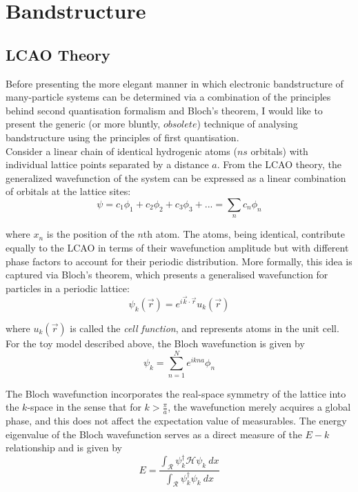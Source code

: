 \chapter{Bandstructure}


\section{LCAO Theory}
Before presenting the more elegant manner in which electronic bandstructure of many-particle systems can be determined via a combination of the principles behind second quantisation formalism and Bloch's theorem, I would like to present the generic (or more bluntly, $obsolete$) technique of analysing bandstructure using the principles of first quantisation. \\

Consider a linear chain of identical hydrogenic atoms ($ns$ orbitals) with individual lattice points separated by a distance $a$. From the LCAO theory, the generalized wavefunction of the system can be expressed as a linear combination of orbitals at the lattice sites:
\begin{equation*}
    \psi = c_{1}\phi_{1} + c_{2}\phi_{2} + c_{3}\phi_{3} + ... = \sum_{n}c_{n}\phi_{n}
\end{equation*}

where $x_{n}$ is the position of the $n$th atom. The atoms, being identical, contribute equally to the LCAO in terms of their wavefunction amplitude but with different phase factors to account for their periodic distribution. More formally, this idea is captured via Bloch's theorem, which presents a generalised wavefunction for particles in a periodic lattice:
\begin{equation*}
    \psi_{k}(\vec{r}) = e^{i\vec{k}\cdot \vec{r}}u_{k}(\vec{r})
\end{equation*}

where $u_{k}(\vec{r})$ is called the \textit{cell function}, and represents atoms in the unit cell. For the toy model described above, the Bloch wavefunction is given by
\begin{equation}
    \psi_{k} = \sum_{n=1}^{N} e^{ikna}\phi_{n}
\end{equation}

The Bloch wavefunction incorporates the real-space symmetry of the lattice into the $k$-space in the sense that for $k > \frac{\pi}{a}$, the wavefunction merely acquires a global phase, and this does not affect the expectation value of measurables. The energy eigenvalue of the Bloch wavefunction serves as a direct measure of the $E-k$ relationship and is given by
\begin{equation}
    E = \frac{\int_{\mathcal{R}} \psi_{k}^{\dagger} \mathcal{H}\psi_{k}\: dx}{\int_{\mathcal{R}} \psi_{k}^{\dagger} \psi_{k}\: dx}
\end{equation}

